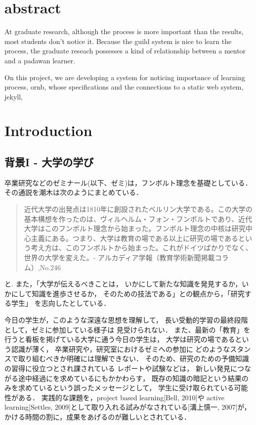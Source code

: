 \documentclass[a4,p11]{article}
\author{bob}
\date{}
\title{}
\begin{document}
\section{abstract}
\label{sec:org2b36e2c}
At graduate research, 
although the process is more important than the results,
most students don't notice it.
Because the guild system is nice to learn the process,
the graduate reseach possesses a kind of
relationship between 
a mentor and a padawan learner.

On this project, 
we are developing a system for
noticing importance of learning process,
ornb, whose specifications and 
the connections to a static web system, jekyll,


\section{Introduction}
\label{sec:orgb6801ff}
\subsection{背景I - 大学の学び}
\label{sec:orged60b1f}
卒業研究などのゼミナール(以下、ゼミ)は，フンボルト理念を基礎としている．その通説を潮木は次のようにまとめている．
\begin{quote}
近代大学の出発点は1810年に創設されたベルリン大学である。この大学の基本構想を作ったのは、ヴィルヘルム・フォン・フンボルトであり、近代大学はこのフンボルト理念から始まった。フンボルト理念の中核は研究中心主義にある。つまり、大学は教育の場である以上に研究の場であるという考え方は、このフンボルトから始まった。これがドイツばかりでなく、世界の大学を変えた。- アルカディア学報（教育学術新聞掲載コラム）,No.246
\end{quote}
と. また，「大学が伝えるべきことは，
いかにして新たな知識を発見するか，いかにして知識を進歩させるか，
そのための技法である」との観点から，「研究する学生」
を志向したとしている．

今日の学生が，このような深遠な思想を理解して，
長い受動的学習の最終段階として，ゼミに参加している様子は
見受けられない．
また、最新の「教育」を行うと看板を掲げている大学に通う今日の学生は，
大学は研究の場であるという認識が薄く，
卒業研究や，研究室におけるゼミへの参加に
どのようなスタンスで取り組むべきか明確には理解できない．
そのため、研究のための予備知識の習得に役立つとされ課されている
レポートや試験などは，
新しい発見につながる途中経過にを求めているにもかかわらす，
既存の知識の暗記という結果のみを求めているという誤ったメッセージとして，
学生に受け取られている可能性がある．
実践的な課題を，project based learning[Bell, 2010]や
active learning[Settles, 2009]として取り入れる試みがなされている[溝上慎一, 2007]が，
かける時間の割に，成果をあげるのが難しいとされている．
\end{document}
